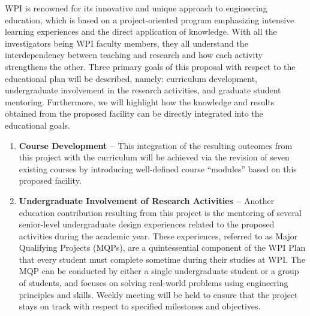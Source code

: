 WPI is renowned for its innovative and unique approach to engineering education, which is 
based on a project-oriented program emphasizing intensive learning experiences and the direct 
application of knowledge. With all the investigators being WPI faculty members, they all 
understand the interdependency between teaching and research and how each activity 
strengthens the other. Three primary goals of this proposal with respect to the educational 
plan will be described, namely: curriculum development, undergraduate involvement in the 
research activities, and graduate student mentoring. Furthermore, we will highlight how the 
knowledge and results obtained from the proposed facility can be directly integrated into the 
educational goals.
%
\begin{enumerate}[\textbullet]
	\listformat
	\item \textbf{Course Development --} This integration of the resulting outcomes from this 
	project with the curriculum will be achieved via the revision of seven existing courses 
	by introducing well-defined course ``modules'' based on this proposed facility.
	
	\item \textbf{Undergraduate Involvement of Research Activities  --} Another education 
	contribution resulting from this project is the mentoring of several senior-level 
	undergraduate design experiences related to the proposed activities during the academic 
	year.  These experiences, referred to as Major Qualifying Projects (MQPs), are a 
	quintessential component of the WPI Plan that every student must complete sometime during 
	their studies at WPI. The MQP can be conducted by either a single undergraduate student 
	or a group of students, and focuses on solving real-world problems using engineering 
	principles and skills.  Weekly meeting will be held to ensure that the project stays on 
	track with respect to specified milestones and objectives.
	

\end{enumerate}
